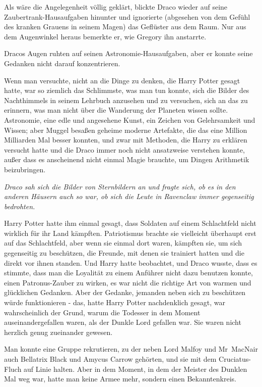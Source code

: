 {Als wäre die Angelegenheit völlig geklärt, blickte Draco wieder auf seine Zaubertrank-Hausaufgaben hinunter und ignorierte (abgesehen von dem Gefühl des kranken Grauens in seinem Magen) das Geflüster aus dem Raum. Nur aus dem Augenwinkel heraus bemerkte er, wie Gregory ihn anstarrte.

Dracos Augen ruhten auf seinen Astronomie-Hausaufgaben, aber er konnte seine Gedanken nicht darauf konzentrieren.

Wenn man versuchte, nicht an die Dinge zu denken, die Harry Potter gesagt hatte, war so ziemlich das Schlimmste, was man tun konnte, sich die Bilder des Nachthimmels in seinem Lehrbuch anzusehen und zu versuchen, sich an das zu erinnern, was man nicht über die Wanderung der Planeten wissen sollte. Astronomie, eine edle und angesehene Kunst, ein Zeichen von Gelehrsamkeit und Wissen; aber Muggel besaßen geheime moderne Artefakte, die das eine Million Milliarden Mal besser konnten, und zwar mit Methoden, die Harry zu erklären versucht hatte und die Draco immer noch nicht ansatzweise verstehen konnte, außer dass es anscheinend nicht einmal Magie brauchte, um Dingen Arithmetik beizubringen.

\emph{Draco sah sich die Bilder von Sternbildern an und fragte sich, ob es in den anderen Häusern auch so war, ob sich die Leute in Ravenclaw immer gegenseitig bedrohten.}

Harry Potter hatte ihm einmal gesagt, dass Soldaten auf einem Schlachtfeld nicht wirklich für ihr Land kämpften. Patriotismus brachte sie vielleicht überhaupt erst auf das Schlachtfeld, aber wenn sie einmal dort waren, kämpften sie, um sich gegenseitig zu beschützen, die Freunde, mit denen sie trainiert hatten und die direkt vor ihnen standen. Und Harry hatte beobachtet, und Draco wusste, dass es stimmte, dass man die Loyalität zu einem Anführer nicht dazu benutzen konnte, einen Patronus-Zauber zu wirken, es war nicht die richtige Art von warmen und glücklichen Gedanken. Aber der Gedanke, jemanden neben sich zu beschützen würde funktionieren - das, hatte Harry Potter nachdenklich gesagt, war wahrscheinlich der Grund, warum die Todesser in dem Moment auseinandergefallen waren, als der Dunkle Lord gefallen war. Sie waren nicht herzlich genug zueinander gewesen.

Man konnte eine Gruppe rekrutieren, zu der neben Lord Malfoy und Mr~MacNair auch Bellatrix Black und Amycus Carrow gehörten, und sie mit dem Cruciatus-Fluch auf Linie halten. Aber in dem Moment, in dem der Meister des Dunklen Mal weg war, hatte man keine Armee mehr, sondern einen Bekanntenkreis.

}
